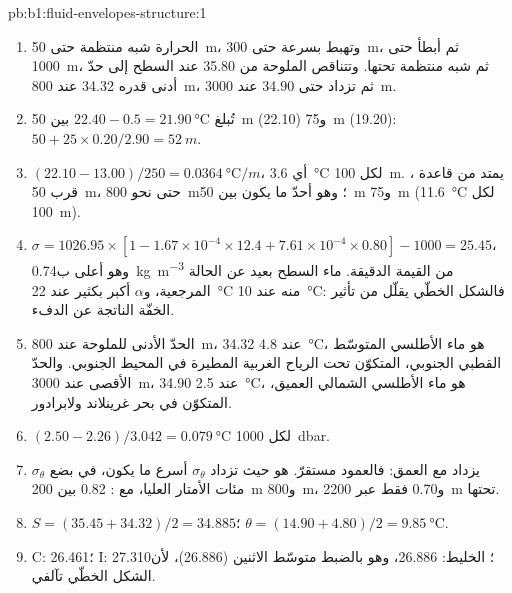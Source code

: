 \begin{solution}{pb:b1:fluid-envelopes-structure:1}
\begin{enumerate}
  \item الحرارة شبه منتظمة حتى \qty{50}{m}، وتهبط بسرعة حتى
        \qty{300}{m}، ثم أبطأ حتى \qty{1000}{m}، ثم شبه منتظمة تحتها.
        وتتناقص الملوحة من 35.80 عند السطح إلى حدّ أدنى قدره 34.32 عند
        \qty{800}{m}، ثم تزداد حتى 34.90 عند \qty{3000}{m}.
  \item تُبلغ $22.40 - 0.5 = \qty{21.90}{\celsius}$ بين \qty{50}{m}
        (22.10) و\qty{75}{m} (19.20): $50 + 25 \times 0.20/2.90 = \qty{52}{m}$.
  \item $(22.10 - 13.00)/250 = \qty{0.0364}{\celsius/m}$، أي \qty{3.6}{\celsius}
        لكل \qty{100}{m}. يمتد  من قاعدة ، قرب \qty{50}{m}، حتى نحو \qty{800}{m}؛ وهو أحدّ ما يكون بين
        \qty{50}{m} و\qty{75}{m} (\qty{11.6}{\celsius} لكل \qty{100}{m}).
  \item $\sigma = 1026.95 \times [1 - 1.67\times10^{-4} \times 12.4 +
        7.61\times10^{-4} \times 0.80] - 1000 = 25.45$، وهو أعلى ب\qty{0.74}{kg.m^{-3}} من القيمة الدقيقة.
        ماء السطح بعيد عن الحالة المرجعية، و$\alpha$
        أكبر بكثير عند \qty{22}{\celsius} منه عند \qty{10}{\celsius}: فالشكل
        الخطّي يقلّل من تأثير الخفّة الناتجة عن الدفء.
  \item الحدّ الأدنى للملوحة عند \qty{800}{m}، 34.32 عند \qty{4.8}{\celsius}، هو ماء الأطلسي المتوسّط القطبي الجنوبي، المتكوّن تحت الرياح الغربية المطيرة في المحيط الجنوبي. والحدّ الأقصى عند \qty{3000}{m}، 34.90 عند
        \qty{2.5}{\celsius}، هو ماء الأطلسي الشمالي العميق، المتكوّن في بحر غرينلاند ولابرادور.
  \item $(2.50 - 2.26)/3.042 = \qty{0.079}{\celsius}$ لكل \qty{1000}{dbar}.
  \item $\sigma_\theta$ يزداد مع العمق: فالعمود مستقرّ.  هو حيث تزداد $\sigma_\theta$ أسرع ما يكون، في بضع مئات الأمتار العليا، مع : \num{0.82} بين \qty{200}{m} و\qty{800}{m}، و\num{0.70} فقط عبر \qty{2200}{m} تحتها.
  \item $S = (35.45 + 34.32)/2 = 34.885$؛ $\theta = (14.90 + 4.80)/2 =
        \qty{9.85}{\celsius}$.
  \item C: 26.461؛ I: 27.310؛ الخليط: 26.886، وهو بالضبط متوسّط الاثنين (26.886)، لأن الشكل الخطّي تآلفي.

\end{enumerate}
\end{solution}
